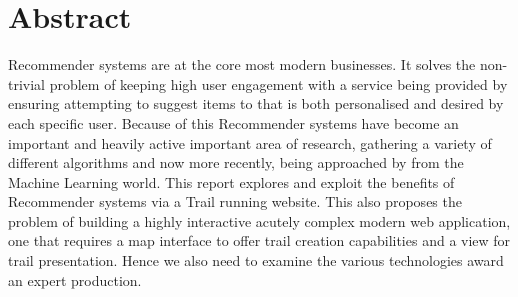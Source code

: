 \chapter*{Abstract}
Recommender systems are at the core most modern businesses. It solves the non-trivial problem of keeping high user engagement with a service being provided by ensuring attempting to suggest items to that is both personalised and desired by each specific user. Because of this Recommender systems have become an important and heavily active important area of research, gathering a variety of different algorithms and now more recently, being approached by from the Machine Learning world. This report  explores and exploit the benefits of Recommender systems via a Trail running website. This also proposes the problem of building a highly interactive acutely complex modern web application, one that requires a map interface to offer trail creation capabilities and a view for trail presentation. Hence we also need to examine the various technologies award an expert production.
